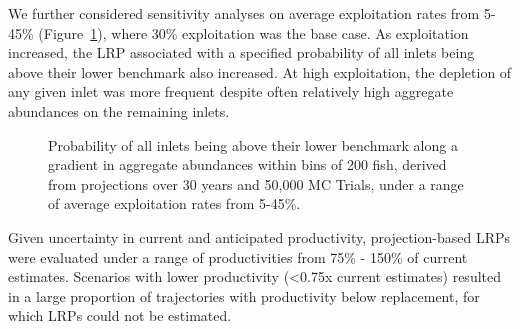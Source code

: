 \documentclass[11pt]{book}
\begin{document}
We further considered sensitivity analyses on average exploitation rates from 5-45\% (Figure~\ref{fig:chinook-projLRPER}), where 30\% exploitation was the base case. As exploitation increased, the LRP associated with a specified probability of all inlets being above their lower benchmark also increased. At high exploitation, the depletion of any given inlet was more frequent despite often relatively high aggregate abundances on the remaining inlets.
\begin{figure}[htb]

{\centering {} 

}

\caption{Probability of all inlets being above their lower benchmark along a gradient in aggregate abundances within bins of 200 fish, derived from projections over 30 years and 50,000 MC Trials, under a range of average exploitation rates from 5-45\%.}\label{fig:chinook-projLRPER}
\end{figure}
\linebreak

Given uncertainty in current and anticipated productivity, projection-based LRPs were evaluated under a range of productivities from 75\% - 150\% of current estimates. Scenarios with lower productivity (\textless0.75x current estimates) resulted in a large proportion of trajectories with productivity below replacement, for which LRPs could not be estimated.
\end{document}
